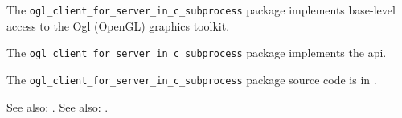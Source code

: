 
The {\tt ogl\_client\_for\_server\_in\_c\_subprocess} package implements base-level access to the Ogl (OpenGL) graphics
toolkit.

The {\tt ogl\_client\_for\_server\_in\_c\_subprocess} package implements the  api.

The {\tt ogl\_client\_for\_server\_in\_c\_subprocess} package source code is in .

See also:  .
See also:  .



